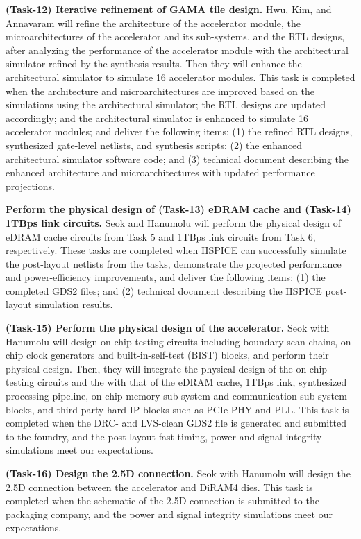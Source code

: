 \noindent
\textbf{(Task-12) Iterative refinement of GAMA tile design.} 
Hwu, Kim, and Annavaram will refine the architecture of the accelerator module, the microarchitectures of the accelerator and its sub-systems, and the RTL designs, after analyzing the performance of the accelerator module with the architectural simulator refined by the synthesis results.
Then they will enhance the architectural simulator to simulate 16 accelerator modules.
This task is completed when 
the architecture and microarchitectures are improved based on the simulations using the architectural simulator; 
the RTL designs are updated accordingly; and
the architectural simulator is enhanced to simulate 16 accelerator modules; and 
deliver the following items:
(1) the refined RTL designs, synthesized gate-level netlists, and synthesis scripts; 
(2) the enhanced architectural simulator software code; and
(3) technical document describing the enhanced architecture and microarchitectures with updated performance projections.


\noindent
\textbf{Perform the physical design of (Task-13) eDRAM cache and (Task-14)  1TBps link circuits.} 
Seok and Hanumolu will perform the physical design of eDRAM cache circuits from Task 5 and 1TBps link circuits from Task 6, respectively.
These tasks are completed when HSPICE can successfully simulate the post-layout netlists from the tasks, demonstrate the projected performance and power-efficiency improvements, and deliver the following items:
(1) the completed GDS2 files; and (2) technical document describing the HSPICE post-layout simulation results.


\noindent
\textbf{(Task-15) Perform the physical design of the accelerator.} 
Seok with Hanumolu will design on-chip testing circuits including boundary scan-chains, on-chip clock generators and built-in-self-test (BIST) blocks, and perform their physical design.
Then, they will integrate the physical design of the on-chip testing circuits and the with that of the eDRAM cache, 1TBps link, synthesized processing pipeline, on-chip memory sub-system and communication sub-system blocks, and third-party hard IP blocks such as PCIe PHY and PLL.
This task is completed when the DRC- and LVS-clean GDS2 file is generated and submitted to the foundry, and the post-layout fast timing, power and signal integrity simulations meet our expectations.


\noindent
\textbf{(Task-16) Design the 2.5D connection.} 
Seok with Hanumolu will design the 2.5D connection between the accelerator and DiRAM4 dies.
This task is completed when the schematic of the 2.5D connection is submitted to the packaging company, and the power and signal integrity simulations meet our expectations.


